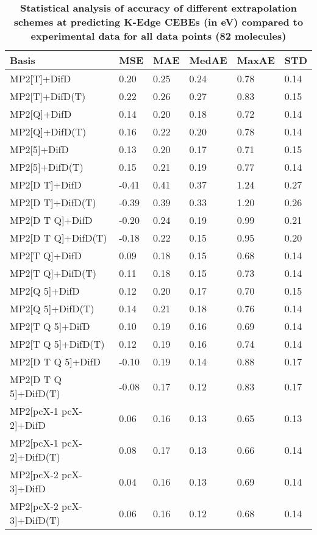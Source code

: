 \begin{table}
  \caption{\textbf{Statistical analysis of accuracy of different extrapolation schemes at predicting K-Edge CEBEs (in eV) compared to experimental data for all data points (82 molecules)}}
  \begin{tabular}{l l l l l l }
    \toprule
    \textbf{Basis} & \textbf{MSE} & \textbf{MAE} & \textbf{MedAE} & \textbf{MaxAE} & \textbf{STD} \\ 
    \midrule
    MP2[T]+DifD & 0.20 & 0.25 & 0.24 & 0.78 & 0.14 \\ 
    MP2[T]+DifD(T) & 0.22 & 0.26 & 0.27 & 0.83 & 0.15 \\ 
    MP2[Q]+DifD & 0.14 & 0.20 & 0.18 & 0.72 & 0.14 \\ 
    MP2[Q]+DifD(T) & 0.16 & 0.22 & 0.20 & 0.78 & 0.14 \\ 
    MP2[5]+DifD & 0.13 & 0.20 & 0.17 & 0.71 & 0.15 \\ 
    MP2[5]+DifD(T) & 0.15 & 0.21 & 0.19 & 0.77 & 0.14 \\ 
    MP2[D T]+DifD & -0.41 & 0.41 & 0.37 & 1.24 & 0.27 \\ 
    MP2[D T]+DifD(T) & -0.39 & 0.39 & 0.33 & 1.20 & 0.26 \\ 
    MP2[D T Q]+DifD & -0.20 & 0.24 & 0.19 & 0.99 & 0.21 \\ 
    MP2[D T Q]+DifD(T) & -0.18 & 0.22 & 0.15 & 0.95 & 0.20 \\ 
    MP2[T Q]+DifD & 0.09 & 0.18 & 0.15 & 0.68 & 0.14 \\ 
    MP2[T Q]+DifD(T) & 0.11 & 0.18 & 0.15 & 0.73 & 0.14 \\ 
    MP2[Q 5]+DifD & 0.12 & 0.20 & 0.17 & 0.70 & 0.15 \\ 
    MP2[Q 5]+DifD(T) & 0.14 & 0.21 & 0.18 & 0.76 & 0.14 \\ 
    MP2[T Q 5]+DifD & 0.10 & 0.19 & 0.16 & 0.69 & 0.14 \\ 
    MP2[T Q 5]+DifD(T) & 0.12 & 0.19 & 0.16 & 0.74 & 0.14 \\ 
    MP2[D T Q 5]+DifD & -0.10 & 0.19 & 0.14 & 0.88 & 0.17 \\ 
    MP2[D T Q 5]+DifD(T) & -0.08 & 0.17 & 0.12 & 0.83 & 0.17 \\ 
    MP2[pcX-1 pcX-2]+DifD & 0.06 & 0.16 & 0.13 & 0.65 & 0.13 \\ 
    MP2[pcX-1 pcX-2]+DifD(T) & 0.08 & 0.17 & 0.13 & 0.66 & 0.14 \\ 
    MP2[pcX-2 pcX-3]+DifD & 0.04 & 0.16 & 0.13 & 0.69 & 0.14 \\ 
    MP2[pcX-2 pcX-3]+DifD(T) & 0.06 & 0.16 & 0.12 & 0.68 & 0.14 \\ 

\end{tabular}
\end{table}
